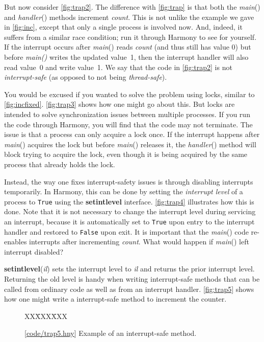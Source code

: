 \documentclass{report}
\newcommand{\harmonysource}[1]{
\begin{tabbing}
XX\=XXX\=XXX\kill
    
\end{tabbing}
}
\newcommand{\harmonylink}[1]{%
[\href{https://www.cs.cornell.edu/home/rvr/harmony/#1}{\underline{#1}}]%
}
\newenvironment{code}{
\tcolorbox
}{
\endtcolorbox
}
\begin{document}
But now consider \autoref{fig:trap2}.  The difference with \autoref{fig:trap} is
that both the \textit{main}() and \textit{handler}() methods increment \textit{count}.
This is not unlike the example we gave in \autoref{fig:inc}, except that only a single
process is involved now.  And, indeed, it suffers from a similar race condition; run
it through Harmony to see for yourself.  If the interrupt occurs after \textit{main}()
reads \textit{count} (and thus still has value 0) but before \textit{main()} writes the
updated value~1, then the interrupt handler will also read value~0 and write value~1.
We say that the code in \autoref{fig:trap2} is not \textit{interrupt-safe} (as opposed
to not being \textit{thread-safe}).

You would be excused if you wanted to solve the problem using locks, similar to
\autoref{fig:incfixed}.  \autoref{fig:trap3} shows how one might go about this.
But locks are intended to solve synchronization issues between multiple processes.
If you run the code through Harmony, you will find that the code may not terminate.
The issue is that a process can only acquire a lock once.  If the interrupt happens
after \textit{main}() acquires the lock but before \textit{main}() releases it, the
\textit{handler}() method will block trying to acquire the lock, even though
it is being acquired by the same process that already holds the lock.

Instead, the way one fixes interrupt-safety issues is through disabling interrupts
temporarily.  In Harmony, this can be done by setting the \textit{interrupt level}
of a process to \texttt{True} using the \textbf{setintlevel} interface.
\autoref{fig:trap4} illustrates how this is done.
Note that it is not necessary to change the interrupt level during servicing an
interrupt, because it is automatically set to \texttt{True} upon entry to the interrupt
handler and restored to \texttt{False} upon exit.
It is important that the \textit{main}() code re-enables interrupts after incrementing
\textit{count}.  What would happen if \textit{main}() left interrupt disabled?

\textbf{setintlevel}(\textit{il}) sets the interrupt level to \textit{il} and returns
the prior interrupt level.  Returning the old level is handy when writing interrupt-safe
methods that can be called from ordinary code as well as from an interrupt handler.
\autoref{fig:trap5} shows how one might write a interrupt-safe method
to increment the counter.

\begin{figure}
\begin{code}
\harmonysource{trap5}
\end{code}
\caption{\harmonylink{code/trap5.hny} Example of an interrupt-safe method.}
\label{fig:trap5}
\end{figure}
\end{document}
